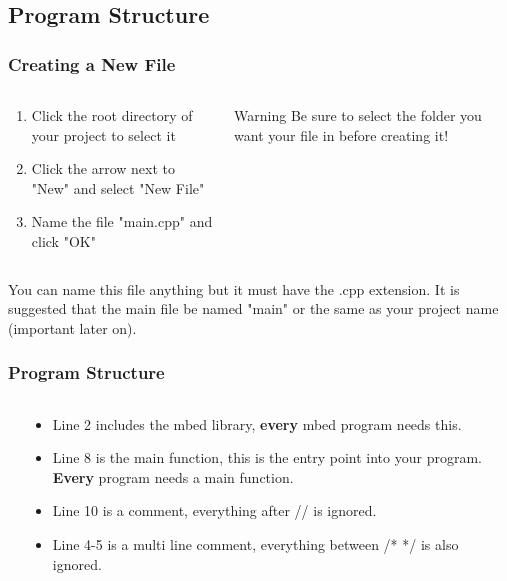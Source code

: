 \subsection{Program Structure}
\label{sub:program_structure}
\begin{frame}
	\frametitle{Creating a New File}
	\begin{columns}[c]
		\begin{column}{0.5\textwidth}
			\begin{enumerate}
				\item Click the root directory of your project to select it
				\item Click the arrow next to "New" and select "New File"
				\item Name the file "main.cpp" and click "OK"
			\end{enumerate}
		\end{column}
		\begin{column}{0.5\textwidth}
			\begin{block}{Warning}
				Be sure to select the folder you want your file in before creating it!
			\end{block}
		\end{column}
	\end{columns}
	\begin{center}
		You can name this file anything but it must have the .cpp extension.
		It is suggested that the main file be named "main" or the same as your project name (important later on).
	\end{center}
\end{frame}

\begin{frame}
	\frametitle{Program Structure}
	\begin{columns}[c]
		\begin{column}{0.45\textwidth}
			
		\end{column}
		\begin{column}{0.55\textwidth}
			\begin{itemize}
				\item Line 2 includes the mbed library, \textbf{every} mbed program needs this.
				\item Line 8 is the main function, this is the entry point into your program.
					\textbf{Every} program needs a main function.
				\item Line 10 is a comment, everything after // is ignored.
				 \item Line 4-5 is a multi line comment, everything between /* */ is also ignored.
			\end{itemize}
		\end{column}
	\end{columns}
\end{frame}